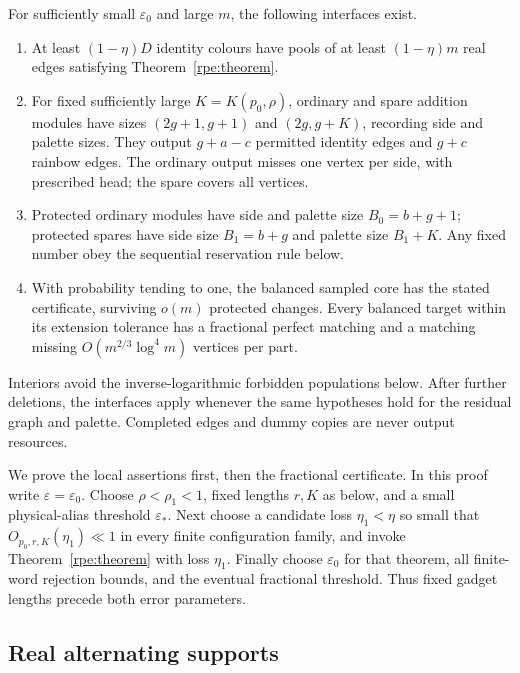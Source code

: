\begin{proposition}\label{rsg:proposition}\label{rpf:proposition}
For sufficiently small $\varepsilon_0$ and large $m$, the following interfaces exist.
\begin{enumerate}
\item At least $(1-\eta)D$ identity colours have pools of at least $(1-\eta)m$ real edges satisfying Theorem~\ref{rpe:theorem}.
\item For fixed sufficiently large $K=K(p_0,\rho)$, ordinary and spare addition modules have sizes $(2g+1,g+1)$ and $(2g,g+K)$, recording side and palette sizes. They output $g+a-c$ permitted identity edges and $g+c$ rainbow edges. The ordinary output misses one vertex per side, with prescribed head; the spare covers all vertices.
\item Protected ordinary modules have side and palette size $B_0=b+g+1$; protected spares have side size $B_1=b+g$ and palette size $B_1+K$. Any fixed number obey the sequential reservation rule below.
\item With probability tending to one, the balanced sampled core has the stated certificate, surviving $o(m)$ protected changes. Every balanced target within its extension tolerance has a fractional perfect matching and a matching missing $O(m^{2/3}\log^4m)$ vertices per part.
\end{enumerate}
Interiors avoid the inverse-logarithmic forbidden populations below. After further deletions, the interfaces apply whenever the same hypotheses hold for the residual graph and palette. Completed edges and dummy copies are never output resources.
\end{proposition}

We prove the local assertions first, then the fractional certificate. In this proof write $\varepsilon=\varepsilon_0$. Choose $\rho<\rho_1<1$, fixed lengths $r,K$ as below, and a small physical-alias threshold $\varepsilon_*$.  Next choose a candidate loss $\eta_1<\eta$ so small that $O_{p_0,r,K}(\eta_1)\ll1$ in every finite configuration family, and invoke Theorem~\ref{rpe:theorem}
with loss $\eta_1$.  Finally choose $\varepsilon_0$ for that theorem, all finite-word rejection bounds, and the eventual fractional
threshold.  Thus fixed gadget lengths precede both error parameters.

\subsection{Real alternating supports}
\label{sg:lem:C4}\label{sg:sec:C7}


